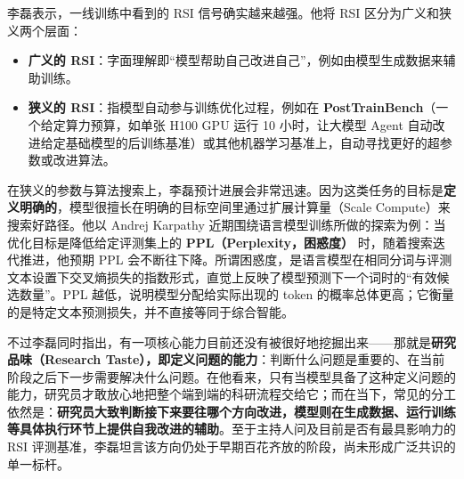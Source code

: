 \documentclass[UTF8,a4paper,11pt,fontset=fandol]{ctexart}
\begin{document}
李磊表示，一线训练中看到的 RSI 信号确实越来越强。他将 RSI 区分为广义和狭义两个层面：
\begin{itemize}
\item \textbf{广义的 RSI}：字面理解即“模型帮助自己改进自己”，例如由模型生成数据来辅助训练。
\item \textbf{狭义的 RSI}：指模型自动参与训练优化过程，例如在 \textbf{PostTrainBench}（一个给定算力预算，如单张 H100 GPU 运行 10 小时，让大模型 Agent 自动改进给定基础模型的后训练基准）或其他机器学习基准上，自动寻找更好的超参数或改进算法。
\end{itemize}

在狭义的参数与算法搜索上，李磊预计进展会非常迅速。因为这类任务的目标是\textbf{定义明确的}，模型很擅长在明确的目标空间里通过扩展计算量（Scale Compute）来搜索好路径。他以 Andrej Karpathy 近期围绕语言模型训练所做的探索为例：当优化目标是降低给定评测集上的 \textbf{PPL（Perplexity，困惑度）} 时，随着搜索迭代推进，他预期 PPL 会不断往下降。所谓困惑度，是语言模型在相同分词与评测文本设置下交叉熵损失的指数形式，直觉上反映了模型预测下一个词时的“有效候选数量”。PPL 越低，说明模型分配给实际出现的 token 的概率总体更高；它衡量的是特定文本预测损失，并不直接等同于综合智能。

不过李磊同时指出，有一项核心能力目前还没有被很好地挖掘出来——那就是\textbf{研究品味（Research Taste），即定义问题的能力}：判断什么问题是重要的、在当前阶段之后下一步需要解决什么问题。在他看来，只有当模型具备了这种定义问题的能力，研究员才敢放心地把整个端到端的科研流程交给它；而在当下，常见的分工依然是：\textbf{研究员大致判断接下来要往哪个方向改进，模型则在生成数据、运行训练等具体执行环节上提供自我改进的辅助}。至于主持人问及目前是否有最具影响力的 RSI 评测基准，李磊坦言该方向仍处于早期百花齐放的阶段，尚未形成广泛共识的单一标杆。
\end{document}
